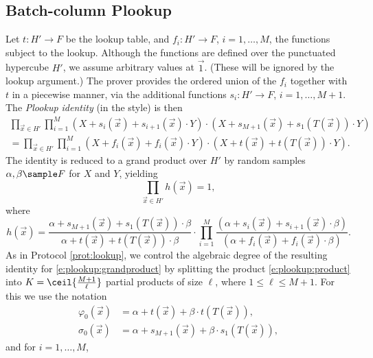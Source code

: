 \documentclass[11pt]{article}
\theoremstyle{definition}
\theoremstyle{definition}
\begin{document}
 

\subsection{Batch-column Plookup}
\label{s:hyperplonk:small}

Let $t: H'\rightarrow F$ be the lookup table, and $f_i:  H'\rightarrow F$, $i=1,\ldots,M$, the functions subject to the lookup.
Although the functions are defined over the punctuated hypercube $H'$, we assume arbitrary values at $\vec 1$.
(These will be ignored by the lookup argument.)
The prover provides the ordered union of the $f_i$  together with $t$ in a piecewise manner, via the additional functions $s_i: H'\rightarrow F$, $i=1,\ldots, M+1$. 
The \textit{Plookup identity} (in the \cite{LookupsBlog} style) is then
\begin{multline*}
\prod_{\vec x\in H'} \prod_{i=1}^{M} (X + s_{i}(\vec x) + s_{i+1}(\vec x)\cdot Y)\cdot (X + s_{M+1}(\vec x) + s_1(T(\vec x))\cdot Y)
\\
= \prod_{\vec x\in H'} \prod_{i=1}^{M} (X + f_i(\vec x) + f_i(\vec x)\cdot Y)\cdot (X + t(\vec x) + t(T(\vec x))\cdot Y).
\end{multline*}
The identity is reduced to a grand product over $H'$ by random samples $\alpha, \beta\sample F$ for $X$ and $Y$, yielding 
\begin{equation}
\label{e:plookup:grandproduct}
\prod_{\vec x\in H'} h(\vec x) = 1,
\end{equation}
where 
\begin{equation}
\label{e:plookup:product}
h(\vec x) = \frac{\alpha + s_{M+1}(\vec x) + s_1(T(\vec x))\cdot \beta}{\alpha + t(\vec x) + t(T(\vec x))\cdot \beta}\cdot 
\prod_{i=1}^M \frac{(\alpha + s_i(\vec x) + s_{i+1}(\vec x)\cdot \beta)}{
(\alpha + f_i(\vec x) + f_i(\vec x)\cdot \beta)}.
\end{equation}
As in Protocol \ref{prot:lookup}, we control the algebraic degree of the resulting identity for \eqref{e:plookup:grandproduct} by splitting the product \eqref{e:plookup:product} into $K= \ceil{\frac{M+1}{\ell}}$  partial products of size $\ell$, where $1\leq \ell\leq M + 1$. 
For this we use the notation
\begin{align*}
\varphi_0(\vec x) &= \alpha + t(\vec x) + \beta\cdot t(T( \vec x)),
\\
\sigma_0(\vec x) &= \alpha + s_{M+1}(\vec x) + \beta\cdot s_1(T( \vec x)),
\end{align*}
and for $i=1,\ldots, M$,
\end{document}

